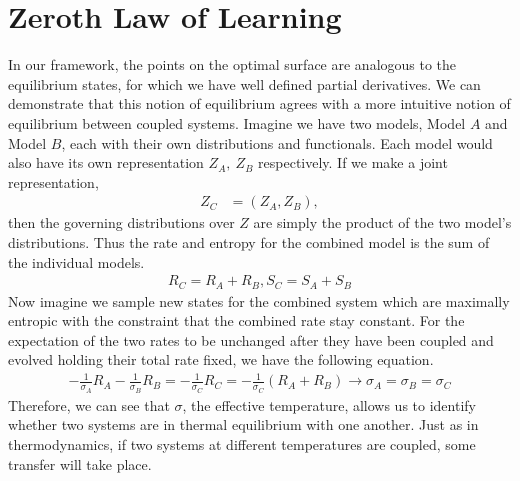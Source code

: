 \documentclass[book.tex]{subfiles}
\begin{document}
\section{Zeroth Law of Learning}
In our framework, the points on the optimal surface are analogous to the equilibrium states, for which we have well defined partial derivatives. We can demonstrate that this notion of equilibrium agrees with a more intuitive notion of equilibrium between coupled systems. Imagine we have two models, Model $A$ and Model $B$, each with their own distributions and functionals. Each model would also have its own representation $Z_A,\ Z_B$ respectively. If we make a joint representation, 
\begin{align}
Z_C &=(Z_A,Z_B),
\end{align}
then the governing distributions over $Z$ are simply the product of the two model's distributions. Thus the rate and entropy for the combined model is the sum of the individual models.
\begin{align}
R_C=R_A+R_B, S_C=S_A+S_B
\end{align}
Now imagine we sample new states for the combined system which are maximally entropic with the constraint that the combined rate stay constant. For the expectation of the two rates to be unchanged after they have been coupled and evolved holding their total rate fixed, we have the following equation.
\begin{align}
-\frac{1}{\sigma_A}R_A-\frac{1}{\sigma_B}R_B=-\frac{1}{\sigma_C}R_C=-\frac{1}{\sigma_C}(R_A+R_B) \longrightarrow \sigma_A=\sigma_B=\sigma_C
\end{align}
Therefore, we can see that $\sigma$, the effective temperature, allows us to identify whether two systems are in thermal equilibrium with one another. Just as in thermodynamics, if two systems at different temperatures are coupled, some transfer will take place.
\end{document}
